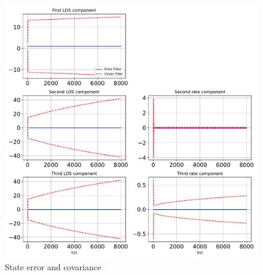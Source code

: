 \begin{figure}[htbp]\centerline{\includegraphics[height=0.9\textwidth, keepaspectratio]{AutoTeX/StatesPlotprop}}\caption{State error and covariance}\label{fig:StatesPlotprop}\end{figure}